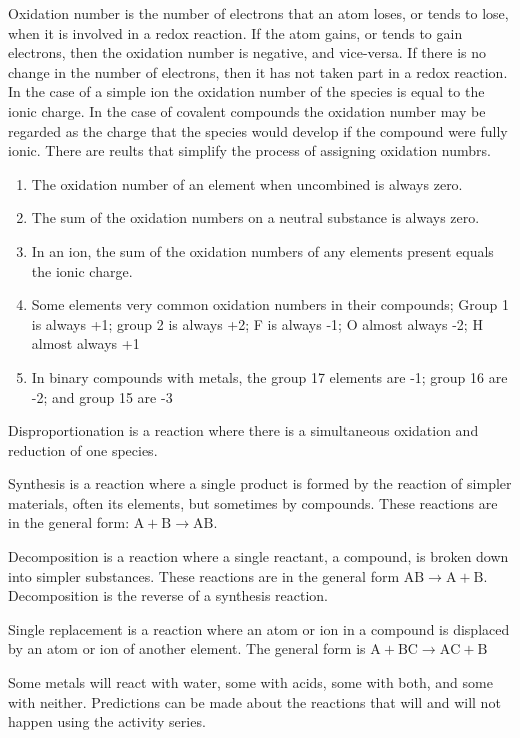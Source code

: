 \documentclass[../chem.tex]{subfiles}
\begin{document}
Oxidation number is the number of electrons that an atom loses, or tends to lose, when it is involved in a redox reaction. If the atom gains, or tends to gain electrons,
then the oxidation number is negative, and vice-versa. If there is no change in the number of electrons, then it has not taken part in a redox reaction.
In the case of a simple ion the oxidation number of the species is equal to the ionic charge. In the case of covalent compounds the oxidation number may be regarded 
as the charge that the species would develop if the compound were fully ionic. There are reults that simplify the process of assigning oxidation numbrs.
\begin{enumerate}
    \item The oxidation number of an element when uncombined is always zero.
    \item The sum of the oxidation numbers on a neutral substance is always zero.
    \item In an ion, the sum of the oxidation numbers of any elements present equals the ionic charge.
    \item Some elements very common oxidation numbers in their compounds; Group 1 is always +1; group 2 is always +2; F is always -1; O almost always -2; H almost always +1
    \item In binary compounds with metals, the group 17 elements are -1; group 16 are -2; and group 15 are -3
\end{enumerate}

Disproportionation is a reaction where there is a simultaneous oxidation and reduction of one species.

Synthesis is a reaction where a single product is formed by the reaction of simpler materials, often its elements, but sometimes by compounds.
These reactions are in the general form: $\text{A}+\text{B}\rightarrow \text{AB}$.

Decomposition is a reaction where a single reactant, a compound, is broken down into simpler substances. These reactions are in the general form
$\text{AB}\rightarrow \text{A}+\text{B}$. Decomposition is the reverse of a synthesis reaction.

Single replacement is a reaction where an atom or ion in a compound is displaced by an atom or ion of another element. The general form is 
$\text{A}+\text{BC}\rightarrow\text{AC}+\text{B}$

Some metals will react with water, some with acids, some with both, and some with neither. Predictions can be made about the reactions 
that will and will not happen using the activity series.
\end{document}
